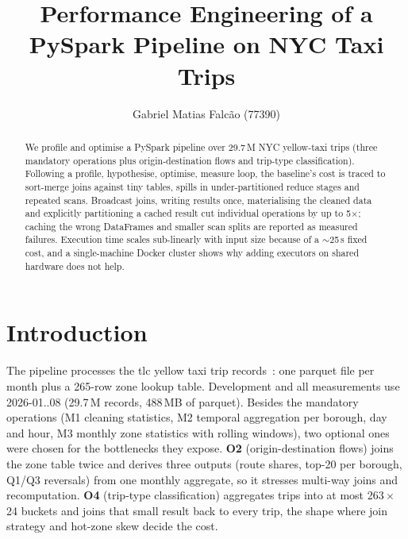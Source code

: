 \documentclass[sigconf]{acmart}
\begin{document}
\title{Performance Engineering of a PySpark Pipeline on NYC Taxi Trips}

\author{Gabriel Matias Falcão (77390)}

\begin{abstract}
      We profile and optimise a PySpark pipeline over 29.7\,M NYC yellow-taxi trips
      (three mandatory operations plus origin-destination flows and trip-type
      classification). Following a profile, hypothesise, optimise, measure loop, the
      baseline's cost is traced to sort-merge joins against tiny tables, spills in
      under-partitioned reduce stages and repeated scans. Broadcast joins, writing
      results once, materialising the cleaned data and explicitly partitioning a
      cached result cut individual operations by up to 5$\times$; caching the wrong
      DataFrames and smaller scan splits are reported as measured failures. Execution
      time scales sub-linearly with input size because of a $\sim$25\,s fixed cost,
      and a single-machine Docker cluster shows why adding executors on shared
      hardware does not help.
\end{abstract}


\maketitle

\section{Introduction}

The pipeline processes the \gls{tlc} yellow taxi trip records~\cite{tlc}: one
parquet file per month plus a 265-row zone lookup table. Development and all
measurements use 2026-01..08 (29.7\,M records, 488\,MB of parquet). Besides the
mandatory operations (M1 cleaning statistics, M2 temporal aggregation per
borough, day and hour, M3 monthly zone statistics with rolling windows), two
optional ones were chosen for the bottlenecks they expose. \textbf{O2}
(origin-destination flows) joins the zone table twice and derives three outputs
(route shares, top-20 per borough, Q1/Q3 reversals) from one monthly aggregate,
so it stresses multi-way joins and recomputation. \textbf{O4} (trip-type
classification) aggregates trips into at most 263\,$\times$\,24 buckets and
joins that small result back to every trip, the shape where join strategy and
hot-zone skew decide the cost.
\end{document}
